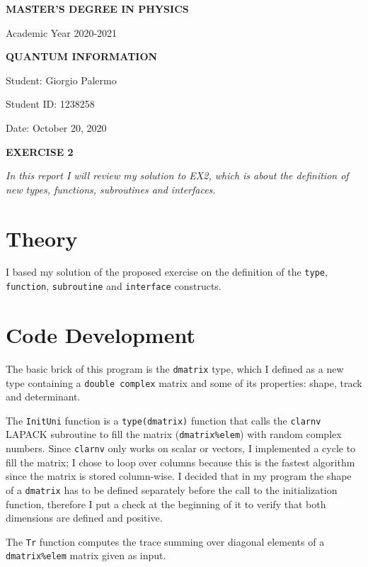\documentclass[a4paper]{article}
\author{Giorgio Palermo}
\begin{document}
\hypersetup{linkcolor = black}
\hypersetup{linkcolor = blue}

\begin{center}
    \textbf{MASTER'S DEGREE IN PHYSICS}
    
    Academic Year 2020-2021
    
    \medskip
    \textbf{QUANTUM INFORMATION}
\end{center}

\vspace{0.0cm}
Student: Giorgio Palermo

Student ID: 1238258

Date: October 20, 2020
\begin{center}
\textbf{EXERCISE 2}
\medskip
\end{center}
\noindent
\textit{In this report I will review my solution to EX2, which is about the definition of new types, functions, subroutines and interfaces.}

\section*{Theory}
I based my solution of the proposed exercise on the definition of the \lstinline{type}, \lstinline{function}, \lstinline{subroutine} and \lstinline{interface} constructs.

\section*{Code Development}
The basic brick of this program is the \lstinline{dmatrix} type, which I defined as a new type containing a \lstinline{double complex} matrix and some of its properties: shape, track and determinant.

The \lstinline{InitUni} function is a \lstinline{type(dmatrix)} function that calls the \lstinline{clarnv} LAPACK subroutine to fill the matrix (\lstinline{dmatrix%elem}) with random complex numbers.
Since \lstinline{clarnv} only works on scalar or vectors, I implemented a cycle to fill the matrix; I chose to loop over columns because this is the fastest algorithm since the matrix is stored column-wise.
I decided that in my program the shape of a \lstinline{dmatrix} has to be defined separately before the call to the initialization function, therefore I put a check at the beginning of it to verify that both dimensions are defined and positive.

The \lstinline{Tr} function computes the trace summing over diagonal elements of a \lstinline{dmatrix%elem} matrix given as input.
\end{document}
